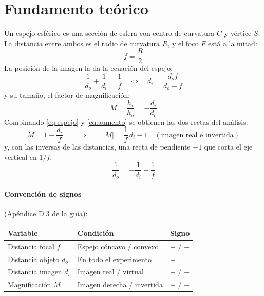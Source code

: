 \documentclass[11pt,a4paper]{article}
\begin{document}
\section{Fundamento teórico}

Un espejo esférico es una sección de esfera con centro de curvatura $C$ y vértice $S$. La distancia entre ambos es el radio de curvatura $R$, y el foco $F$ está a la mitad:
\begin{equation}
  f = \frac{R}{2}
\end{equation}
La posición de la imagen la da la ecuación del espejo:
\begin{equation}
  \frac{1}{d_o} + \frac{1}{d_i} = \frac{1}{f} \quad \Longleftrightarrow \quad d_i = \frac{d_o f}{d_o - f}
  \label{eq:espejo}
\end{equation}
y su tamaño, el factor de magnificación:
\begin{equation}
  M = \frac{h_i}{h_o} = -\frac{d_i}{d_o}
  \label{eq:aumento}
\end{equation}
Combinando \eqref{eq:espejo} y \eqref{eq:aumento} se obtienen las dos rectas del análisis:
\begin{equation}
  M = 1 - \frac{d_i}{f} \qquad \Longrightarrow \qquad |M| = \frac{1}{f}\,d_i - 1 \quad (\text{imagen real e invertida})
  \label{eq:lineal}
\end{equation}
y, con las inversas de las distancias, una recta de pendiente $-1$ que corta el eje vertical en $1/f$:
\begin{equation}
  \frac{1}{d_o} = -\frac{1}{d_i} + \frac{1}{f}
  \label{eq:inversas}
\end{equation}

\paragraph{Convención de signos} (Apéndice D.3 de la guía):
\begin{center}
\begin{tabular}{lll}
\toprule
\textbf{Variable} & \textbf{Condición} & \textbf{Signo} \\
\midrule
Distancia focal $f$ & Espejo cóncavo / convexo & $+$ / $-$ \\
Distancia objeto $d_o$ & En todo el experimento & $+$ \\
Distancia imagen $d_i$ & Imagen real / virtual & $+$ / $-$ \\
Magnificación $M$ & Imagen derecha / invertida & $+$ / $-$ \\
\bottomrule
\end{tabular}
\end{center}
\end{document}
